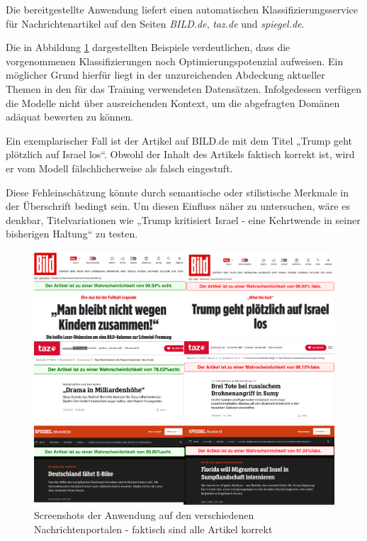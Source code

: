 Die bereitgestellte Anwendung liefert einen automatischen Klassifizierungsservice für Nachrichtenartikel auf den Seiten 
\textit{BILD.de}, \textit{taz.de} und \textit{spiegel.de}.

Die in Abbildung \ref{fig:screenshot_anwendung} dargestellten Beispiele verdeutlichen, dass die vorgenommenen Klassifizierungen noch Optimierungspotenzial aufweisen.
Ein möglicher Grund hierfür liegt in der unzureichenden Abdeckung aktueller Themen in den für das Training verwendeten Datensätzen. Infolgedessen verfügen die Modelle nicht 
über ausreichenden Kontext, um die abgefragten Domänen adäquat bewerten zu können.

Ein exemplarischer Fall ist der Artikel auf BILD.de mit dem Titel „Trump geht plötzlich auf Israel los“. Obwohl der Inhalt des Artikels faktisch korrekt ist, 
wird er vom Modell fälschlicherweise als falsch eingestuft.

Diese Fehleinschätzung könnte durch semantische oder stilistische Merkmale in der Überschrift bedingt sein. Um diesen Einfluss näher zu untersuchen, wäre es denkbar, 
Titelvariationen wie „Trump kritisiert Israel - eine Kehrtwende in seiner bisherigen Haltung“ zu testen.

\begin{figure}[htbp]
    \begin{center}
        \includegraphics[width=\linewidth]{static/screenshots_anwendung.png}
        \caption{\label{fig:screenshot_anwendung} Screenshots der Anwendung auf den verschiedenen Nachrichtenportalen - faktisch sind alle Artikel korrekt}
    \end{center}
\end{figure}